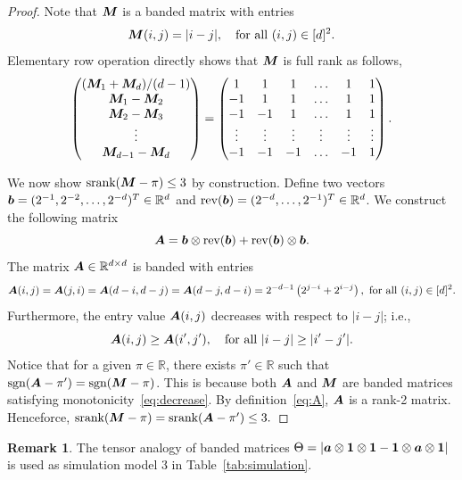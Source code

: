 \documentclass[11pt]{article}
\theoremstyle{plain}
\theoremstyle{definition}
\newtheorem{rmk}{Remark}
\def\sign{\textup{sgn}}
\def\srank{\textup{srank}}
\begin{document}
\begin{proof}
Note that $\bm M$ is a banded matrix with entries
\[
\bm M(i,j)={|i-j|}, \quad \text{for all }(i,j)\in[d]^2.
\]
Elementary row operation directly shows that $\bm M$ is full rank as follows,
\begin{align}
\begin{pmatrix}
(\bm M_1+\bm M_d)/(d-1)\\
\bm M_1-\bm M_2\\
\bm M_2-\bm M_3\\
\vdots\\
\bm M_{d-1}-\bm M_{d}
\end{pmatrix} = 
\begin{pmatrix}
1&1&1&\ldots&1&1\\
-1&1&1&\ldots&1&1\\
-1&-1&1&\ldots&1&1\\
\vdots&\vdots&\vdots&\vdots&\vdots&\vdots\\
-1&-1&-1&\ldots&-1&1
\end{pmatrix}.
\end{align}

We now show $\srank(\mM-\pi)\leq 3$ by construction. Define two vectors $\bm{b}=(2^{-1},2^{-2},\ldots,2^{-d})^T\in\mathbb{R}^d$ and $\text{rev}(\bm{b})=(2^{-d},\ldots,2^{-1})^T\in\mathbb{R}^d$. We construct the following matrix
\begin{equation}\label{eq:A}
\bm A=\bm{b}\otimes\text{rev}(\bm{b})+\text{rev}(\bm{b})\otimes\bm{b}.
\end{equation}
The matrix $\bm A\in\mathbb{R}^{d\times d}$ is banded with entries
\[
\mA(i,j)=\mA(j,i)=\mA(d-i,d-j)=\mA(d-j,d-i)=2^{-d-1}\left(2^{j-i}+2^{i-j}\right),\ \text{for all }(i,j)\in[d]^2.
\] 
Furthermore, the entry value $\bm A(i,j)$ decreases with respect to $|i-j|$; i.e., 
\begin{equation}\label{eq:decrease}
\bm A(i,j) \geq \bm A(i',j'), \quad \text{for all }|i-j|\geq |i'-j'|.
\end{equation}
Notice that for a given $\pi\in\mathbb{R}$, there exists $\pi'\in\mathbb{R}$ such that $\sign(\mA-\pi')=\sign(\mM-\pi)$. This is because both $\bm A$ and $\bm M$ are banded matrices satisfying monotonicity~\eqref{eq:decrease}. By definition~\eqref{eq:A}, $\bm A$ is a rank-2 matrix. Henceforce, $\srank(\mM-\pi)=\srank(\mA-\pi')\leq 3.$
\end{proof}

\begin{rmk} The tensor analogy of banded matrices $\Theta=|\bm{a}\otimes\mathbf{1}\otimes \mathbf{1}-\mathbf{1}\otimes\bm{a}\otimes \mathbf{1}|$ is used as simulation model 3 in Table~\ref{tab:simulation}.  
\end{rmk}
\end{document}
